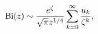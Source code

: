\[\mathop{\mathrm{Bi}\/}\nolimits\!\left(z\right)\sim\frac{e^{\zeta}}{\sqrt{\pi}%
z^{1/4}}\sum_{k=0}^{\infty}\frac{u_{k}}{\zeta^{k}},\]